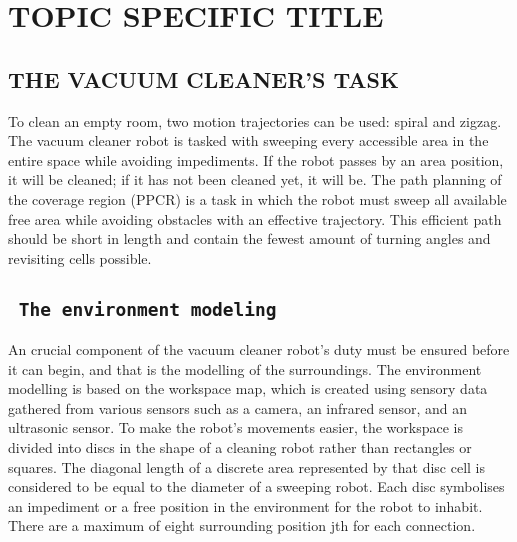 \chapter{\centering \textbf{\MakeUppercase{Topic Specific Title}}}

\section{\textbf{\MakeUppercase{the vacuum cleaner’s task}}}
\justifying
To clean an empty room, two motion trajectories can be used: spiral and zigzag.
The vacuum cleaner robot is tasked with sweeping every accessible area in the entire space while avoiding impediments. If the robot passes by an area position, it will be cleaned; if it has not been cleaned yet, it will be.
The path planning of the coverage region (PPCR) is a task in which the robot must sweep all available free area while avoiding obstacles with an effective trajectory.
This efficient path should be short in length and contain the fewest amount of turning angles and revisiting cells possible.
\section{\texttt{ The environment modeling}}
\justifying
An crucial component of the vacuum cleaner robot's duty must be ensured before it can begin, and that is the modelling of the surroundings.
The environment modelling is based on the workspace map, which is created using sensory data gathered from various sensors such as a camera, an infrared sensor, and an ultrasonic sensor.
To make the robot's movements easier, the workspace is divided into discs in the shape of a cleaning robot rather than rectangles or squares. The diagonal length of a discrete area represented by that disc cell is considered to be equal to the diameter of a sweeping robot.
Each disc symbolises an impediment or a free position in the environment for the robot to inhabit. There are a maximum of eight surrounding position jth for each connection.
